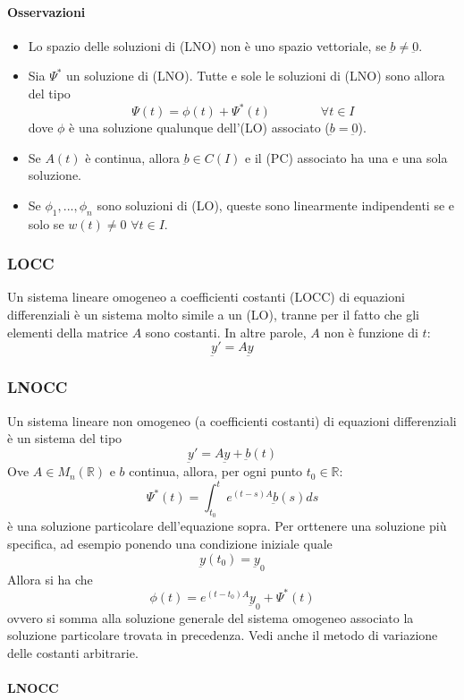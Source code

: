 \documentclass[a4paper,12pt]{article}
\begin{document}
\paragraph{Osservazioni}
\begin{itemize}
 \item Lo spazio delle soluzioni di (LNO) non è uno spazio vettoriale, se $\underbar{b}\neq\underbar{0}$.
 \item Sia $\Psi^*$ un soluzione di (LNO). Tutte e sole le soluzioni di (LNO) sono allora del tipo
       $$ \Psi(t) = \phi(t) + \Psi^*(t)\qquad \qquad \forall t \in I$$
       dove $\phi$ è una soluzione qualunque dell'(LO) associato ($\underbar{b}=\underbar{0}$).
 \item Se $A(t)$ è continua, allora $\underbar{b}\in C(I)$ e il (PC) associato ha una e una sola soluzione.
 \item Se $\phi_1,...,\phi_n$ sono soluzioni di (LO), queste sono linearmente indipendenti se e solo se $w(t)\neq0$ $\forall t \in I$.
\end{itemize}

\subsubsection{LOCC}
Un sistema lineare omogeneo a coefficienti costanti (LOCC) di equazioni differenziali è un sistema molto simile a un (LO), tranne per il fatto che gli elementi della matrice $A$ sono costanti. In altre parole, $A$ non è funzione di $t$:
$$\underbar{y}' = A\underbar{y}$$

\subsubsection{LNOCC}
Un sistema lineare non omogeneo (a coefficienti costanti) di equazioni differenziali è un sistema del tipo
$$\underbar{y}'=A\underbar{y}+\underbar{b}(t)$$
Ove $A\in M_n(\mathbb{R})$ e $b$ continua, allora, per ogni punto $t_0 \in \mathbb{R}$:
$$\Psi^*(t)= \int_{t_0}^t e^{(t-s)A} \underbar{b}(s)ds$$
è una soluzione particolare dell'equazione sopra.
Per orttenere una soluzione più specifica, ad esempio ponendo una condizione iniziale quale
$$\underbar{y}(t_0)=\underbar{y}_0$$
Allora si ha che
$$\phi(t)=e^{(t-t_0)A}\underbar{y}_0+\Psi^*(t)$$
ovvero si somma alla soluzione generale del sistema omogeneo associato la soluzione particolare trovata in precedenza.
Vedi anche il metodo di variazione delle costanti arbitrarie.

\paragraph{LNOCC}
\end{document}
